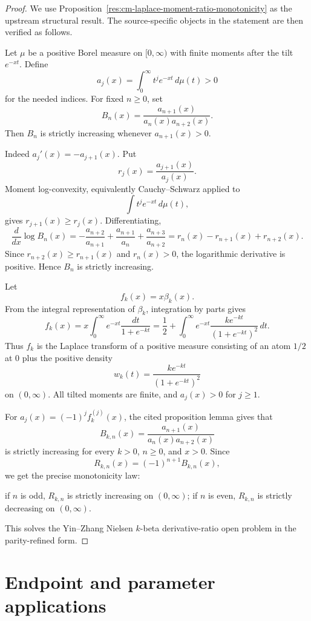 \documentclass[11pt]{article}
\numberwithin{equation}{section}
\theoremstyle{definition}
\theoremstyle{remark}
\newcommand{\1}{\mathbf 1}
\begin{document}
\begin{proof}
We use Proposition~\ref{res:cm-laplace-moment-ratio-monotonicity} as the upstream structural result. The source-specific objects in the statement are then verified as follows.

Let \(\mu\) be a positive Borel measure on \([0,\infty)\) with finite moments after the tilt \(e^{-xt}\). Define
\[
a_j(x)=\int_0^\infty t^j e^{-xt}\,d\mu(t)>0
\]
for the needed indices. For fixed \(n\ge0\), set
\[
B_n(x)=\frac{a_{n+1}(x)}{a_n(x)a_{n+2}(x)}.
\]
Then \(B_n\) is strictly increasing whenever \(a_{n+1}(x)>0\).

Indeed \(a_j'(x)=-a_{j+1}(x)\). Put
\[
r_j(x)=\frac{a_{j+1}(x)}{a_j(x)}.
\]
Moment log-convexity, equivalently Cauchy--Schwarz applied to
\[
\int t^j e^{-xt}\,d\mu(t),
\]
gives \(r_{j+1}(x)\ge r_j(x)\). Differentiating,
\[
\frac{d}{dx}\log B_n(x)
=-\frac{a_{n+2}}{a_{n+1}}
+\frac{a_{n+1}}{a_n}
+\frac{a_{n+3}}{a_{n+2}}
=r_n(x)-r_{n+1}(x)+r_{n+2}(x).
\]
Since \(r_{n+2}(x)\ge r_{n+1}(x)\) and \(r_n(x)>0\), the logarithmic derivative is positive. Hence \(B_n\) is strictly increasing.

Let
\[
f_k(x)=x\beta_k(x).
\]
From the integral representation of \(\beta_k\), integration by parts gives
\[
f_k(x)
=x\int_0^\infty e^{-xt}\frac{dt}{1+e^{-kt}}
=\frac12+\int_0^\infty e^{-xt}\frac{k e^{-kt}}{(1+e^{-kt})^2}\,dt.
\]
Thus \(f_k\) is the Laplace transform of a positive measure consisting of an atom \(1/2\) at \(0\) plus the positive density
\[
w_k(t)=\frac{k e^{-kt}}{(1+e^{-kt})^2}
\]
on \((0,\infty)\). All tilted moments are finite, and \(a_{j}(x)>0\) for \(j\ge1\).

For \(a_j(x)=(-1)^j f_k^{(j)}(x)\), the cited proposition lemma gives that
\[
B_{k,n}(x)=\frac{a_{n+1}(x)}{a_n(x)a_{n+2}(x)}
\]
is strictly increasing for every \(k>0\), \(n\ge0\), and \(x>0\). Since
\[
R_{k,n}(x)=(-1)^{n+1}B_{k,n}(x),
\]
we get the precise monotonicity law:

if \(n\) is odd, \(R_{k,n}\) is strictly increasing on \((0,\infty)\);
if \(n\) is even, \(R_{k,n}\) is strictly decreasing on \((0,\infty)\).

This solves the Yin--Zhang Nielsen \(k\)-beta derivative-ratio open problem in the parity-refined form.
\end{proof}

\section{Endpoint and parameter applications}
\label{sec:endpoint-parameter-applications}
\end{document}
